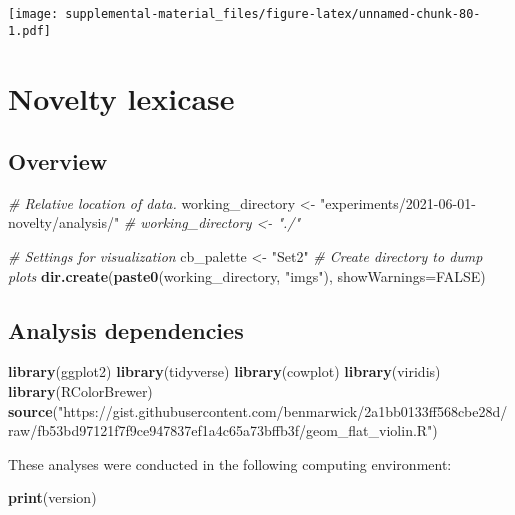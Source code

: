 \documentclass[]{book}
\newenvironment{Shaded}{\begin{snugshade}}{\end{snugshade}}
\newcommand{\CommentTok}[1]{\textcolor[rgb]{0.56,0.35,0.01}{\textit{#1}}}
\newcommand{\DataTypeTok}[1]{\textcolor[rgb]{0.13,0.29,0.53}{#1}}
\newcommand{\KeywordTok}[1]{\textcolor[rgb]{0.13,0.29,0.53}{\textbf{#1}}}
\newcommand{\NormalTok}[1]{#1}
\newcommand{\OtherTok}[1]{\textcolor[rgb]{0.56,0.35,0.01}{#1}}
\newcommand{\StringTok}[1]{\textcolor[rgb]{0.31,0.60,0.02}{#1}}
\begin{document}
\texttt{[image: supplemental-material\_files/figure-latex/unnamed-chunk-80-1.pdf]}

\hypertarget{novelty-lexicase}{%
\chapter{Novelty lexicase}\label{novelty-lexicase}}

\hypertarget{overview-7}{%
\section{Overview}\label{overview-7}}

\begin{Shaded}
\begin{Highlighting}[]
\CommentTok{# Relative location of data.}
\NormalTok{working_directory <-}\StringTok{ "experiments/2021-06-01-novelty/analysis/"}
\CommentTok{# working_directory <- "./"}

\CommentTok{# Settings for visualization}
\NormalTok{cb_palette <-}\StringTok{ "Set2"}
\CommentTok{# Create directory to dump plots}
\KeywordTok{dir.create}\NormalTok{(}\KeywordTok{paste0}\NormalTok{(working_directory, }\StringTok{"imgs"}\NormalTok{), }\DataTypeTok{showWarnings=}\OtherTok{FALSE}\NormalTok{)}
\end{Highlighting}
\end{Shaded}

\hypertarget{analysis-dependencies-7}{%
\section{Analysis dependencies}\label{analysis-dependencies-7}}

\begin{Shaded}
\begin{Highlighting}[]
\KeywordTok{library}\NormalTok{(ggplot2)}
\KeywordTok{library}\NormalTok{(tidyverse)}
\KeywordTok{library}\NormalTok{(cowplot)}
\KeywordTok{library}\NormalTok{(viridis)}
\KeywordTok{library}\NormalTok{(RColorBrewer)}
\KeywordTok{source}\NormalTok{(}\StringTok{"https://gist.githubusercontent.com/benmarwick/2a1bb0133ff568cbe28d/raw/fb53bd97121f7f9ce947837ef1a4c65a73bffb3f/geom_flat_violin.R"}\NormalTok{)}
\end{Highlighting}
\end{Shaded}

These analyses were conducted in the following computing environment:

\begin{Shaded}
\begin{Highlighting}[]
\KeywordTok{print}\NormalTok{(version)}
\end{Highlighting}
\end{Shaded}
\end{document}
